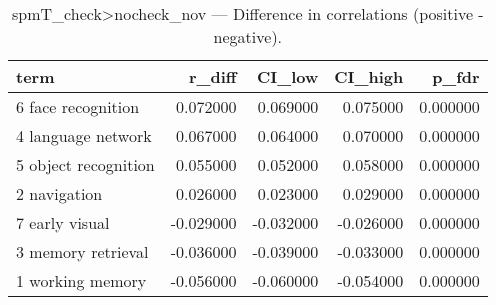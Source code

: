 \begin{table}
\caption{spmT_check>nocheck_nov — Difference in correlations (positive - negative).}
\label{tab:spmT_check>nocheck_nov_diff}
\begin{tabular}{lrrrr}
\toprule
term & r\_diff & CI\_low & CI\_high & p\_fdr \\
\midrule
6 face recognition & 0.072000 & 0.069000 & 0.075000 & 0.000000 \\
4 language network & 0.067000 & 0.064000 & 0.070000 & 0.000000 \\
5 object recognition & 0.055000 & 0.052000 & 0.058000 & 0.000000 \\
2 navigation & 0.026000 & 0.023000 & 0.029000 & 0.000000 \\
7 early visual & -0.029000 & -0.032000 & -0.026000 & 0.000000 \\
3 memory retrieval & -0.036000 & -0.039000 & -0.033000 & 0.000000 \\
1 working memory & -0.056000 & -0.060000 & -0.054000 & 0.000000 \\
\bottomrule
\end{tabular}
\end{table}
